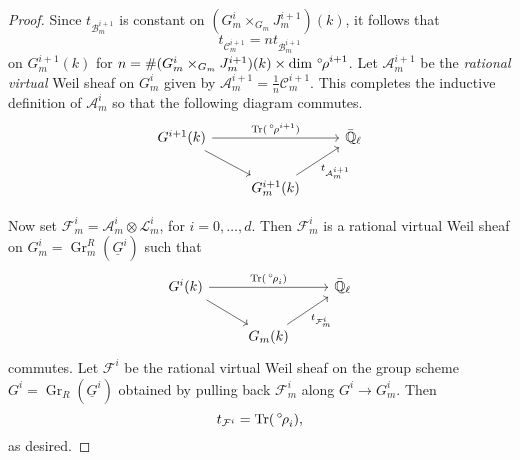 \documentclass[10pt]{amsart}
\theoremstyle{plain}
\theoremstyle{definition}
\newcommand{\EE}{\mathbb{\bar Q}_\ell}
\newcommand{\Fq}{k}
\DeclareMathOperator{\Gr}{Gr}
\DeclareMathOperator{\trace}{Tr}
\newcommand{\trFrob}[1]{t_{#1}}
\newcommand{\cs}[1]{{\mathcal{#1}}}
\newcommand{\orho}{{\,^\circ \hskip-1pt \rho}}
\begin{document}
\begin{proof}
Since $\trFrob{\cs{B}^{i+1}_m}$ is constant on $(G_m^{i}\times_{G_m} J_m^{i+1})(\Fq)$, it follows that 
\[
\trFrob{\cs{C}^{i+1}_m} = n \trFrob{\cs{B}^{i+1}_m}
\]
on $G_m^{i+1}(\Fq)$ for $n = \# (G_m^{i}\times_{G_m} J_m^{i+1})(\Fq) \times \dim \orho^{i+1} $.
Let $\cs{A}_m^{i+1}$ be the \emph{rational virtual} Weil sheaf on $G_m^i$ given by $\cs{A}_m^{i+1} = \frac{1}{n} \cs{C}_m^{i+1}$. 
%
This completes the inductive definition of $\cs{A}_m^i$ so that the following diagram commutes.
\[
\begin{tikzcd}
G^{i+1}(\Fq) \arrow{rr}{\trace(\orho^{i+1})} \arrow{rd} && \EE\\
& G_m^{i+1}(\Fq)\arrow{ru}[swap]{{\trFrob{\cs{A}_m^{i+1}}} } & 
\end{tikzcd}
\]

Now set $\cs{F}^i_m = \cs{A}_m^{i} \otimes \cs{L}_m^i$, for $i=0, \ldots ,d$.
Then $\cs{F}^i_m$ is a rational virtual Weil sheaf on $G^i_m = \Gr^{R}_m(\underline{G}^i)$ such that
\[
\begin{tikzcd}
G^i(\Fq) \arrow{rr}{\trace(\orho_i)} \arrow{rd} && \EE\\
& G_m(\Fq) \arrow{ru}[swap]{\trFrob{\cs{F}^i_m}} & 
\end{tikzcd}
\]
commutes.
Let $\cs{F}^i$ be the rational virtual Weil sheaf on the group scheme $G^i= \Gr_{R}(\underline{G}^i)$ obtained by pulling back $\cs{F}_m^i$ along $G^i \to G^i_m$.
Then 
\[
\trFrob{\cs{F}^i} = \trace(\orho_i),
\] 
as desired.
\end{proof}
\end{document}
